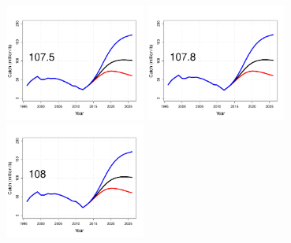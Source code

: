 \begin{figure}[htbp]
	\centering
		\includegraphics[height=1.5in]{../FIGURES/SIZELIMIT/fig_32_DI_YBio.pdf}
		\includegraphics[height=1.5in]{../FIGURES/SIZELIMIT/fig_29_DI_YBio.pdf}
		\includegraphics[height=1.5in]{../FIGURES/SIZELIMIT/fig_26_DI_YBio.pdf}
		                                                              

\end{figure}
